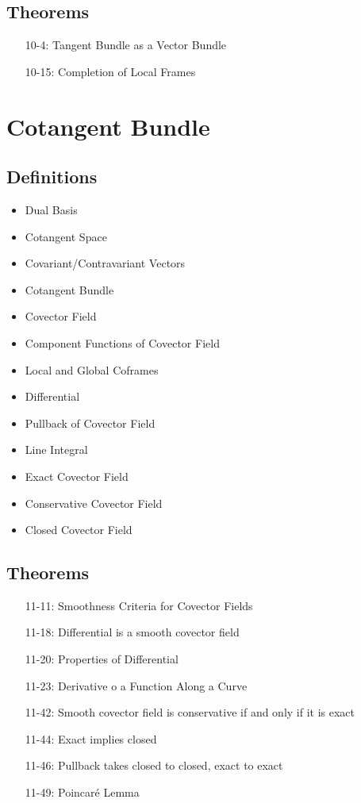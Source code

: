 \documentclass[11.5pt]{scrartcl}
\newcommand{\<}{\langle}
\renewcommand{\>}{\rangle}
\begin{document}
\subsection{Theorems}
\begin{itemize}
\item[10-4:] Tangent Bundle as a Vector Bundle 
\item[10-15:] Completion of Local Frames
\end{itemize}
\section{Cotangent Bundle}
\subsection{Definitions}
\begin{itemize}
\item Dual Basis
\item Cotangent Space
\item Covariant/Contravariant Vectors
\item Cotangent Bundle
\item Covector Field
\item Component Functions of Covector Field
\item Local and Global Coframes
\item Differential
\item Pullback of Covector Field
\item Line Integral
\item Exact Covector Field
\item Conservative Covector Field
\item Closed Covector Field
\end{itemize}
\subsection{Theorems}
\begin{itemize}
\item[11-11:] Smoothness Criteria for Covector Fields
\item[11-18:] Differential is a smooth covector field
\item[11-20:] Properties of Differential
\item[11-23:] Derivative o a Function Along a Curve
\item[11-42:] Smooth covector field is conservative if and only if it is exact
\item[11-44:] Exact implies closed
\item[11-46:] Pullback takes closed to closed, exact to exact
\item[11-49:] Poincaré Lemma
\end{itemize}
\end{document}
